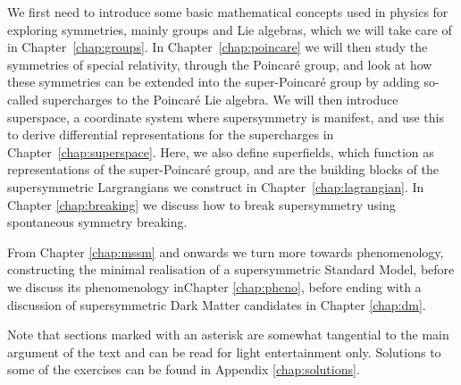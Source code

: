 \documentclass[11pt,a4paper]{book}
\begin{document}
We first need to introduce some basic mathematical concepts used in physics for exploring symmetries, mainly groups and Lie algebras, which we will take care of in Chapter~\ref{chap:groups}. 
In Chapter~\ref{chap:poincare} we will then study the symmetries of special relativity, through the Poincaré group, and look at how these symmetries can be extended into the super-Poincaré group by adding so-called supercharges to the Poincaré Lie algebra.
We will then introduce superspace, a coordinate system where supersymmetry is manifest, and use this to derive differential representations for the supercharges in Chapter~\ref{chap:superspace}. Here, we also define superfields, which function as representations of the super-Poincaré group, and are the building blocks of the supersymmetric Largrangians we construct in Chapter~\ref{chap:lagrangian}. In Chapter \ref{chap:breaking} we discuss how to break supersymmetry using spontaneous symmetry breaking.

From Chapter \ref{chap:mssm} and onwards we turn more towards phenomenology, constructing the minimal realisation of a supersymmetric Standard Model, before we discuss its phenomenology inChapter \ref{chap:pheno}, before ending with a discussion of supersymmetric Dark Matter candidates in Chapter \ref{chap:dm}.

Note that sections marked with an asterisk are somewhat tangential to the main argument of the text and can be read for light entertainment only. Solutions to some of the exercises can be found in Appendix \ref{chap:solutions}.
























\end{document}

